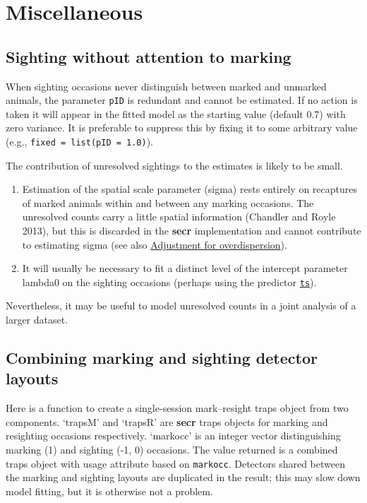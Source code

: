 \documentclass[
]{book}
\providecommand{\tightlist}{%
  \setlength{\itemsep}{0pt}\setlength{\parskip}{0pt}}
\begin{document}
\section{Miscellaneous}\label{miscellaneous}

\subsection{Sighting without attention to marking}\label{appendix2}

When sighting occasions never distinguish between marked and unmarked animals, the parameter \texttt{pID} is redundant and cannot be estimated. If no action is taken it will appear in the fitted model as the starting value (default 0.7) with zero variance. It is preferable to suppress this by fixing it to some arbitrary value (e.g., \texttt{fixed\ =\ list(pID\ =\ 1.0)}).

The contribution of unresolved sightings to the estimates is likely to be small.

\begin{enumerate}
\def\labelenumi{\arabic{enumi}.}
\tightlist
\item
  Estimation of the spatial scale parameter (sigma) rests entirely on recaptures of marked animals within and between any marking occasions. The unresolved counts carry a little spatial information (Chandler and Royle 2013), but this is discarded in the \textbf{secr} implementation and cannot contribute to estimating sigma (see also \hyperref[adjustoverdispersion]{Adjustment for overdispersion}).
\item
  It will usually be necessary to fit a distinct level of the intercept parameter lambda0 on the sighting occasions (perhaps using the predictor \hyperref[ts]{\texttt{ts}}).
\end{enumerate}

Nevertheless, it may be useful to model unresolved counts in a joint analysis of a larger dataset.

\subsection{Combining marking and sighting detector layouts}\label{appendix3}

Here is a function to create a single-session mark--resight traps object from two components. `trapsM' and `trapsR' are \textbf{secr} traps objects for marking and resighting occasions respectively. `markocc' is an integer vector distinguishing marking (1) and sighting (-1, 0) occasions. The value returned is a combined traps object with usage attribute based on \texttt{markocc}. Detectors shared between the marking and sighting layouts are duplicated in the result; this may slow down model fitting, but it is otherwise not a problem.
\end{document}
